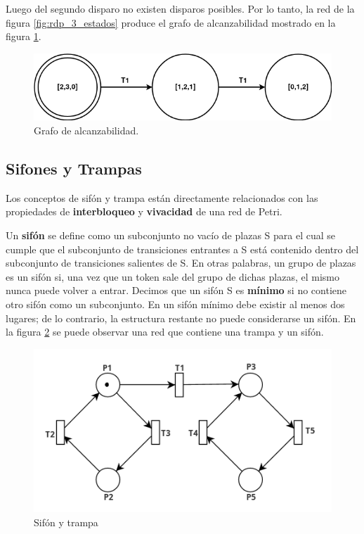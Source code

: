 Luego del segundo disparo no existen disparos posibles. Por lo tanto, la red de la figura \ref{fig:rdp_3_estados} produce el grafo de alcanzabilidad mostrado en la figura \ref{fig:grafo_alcanzabilidad}. \\

\begin{figure}[H]
    \centering
    \includegraphics[scale=0.4]{images/grafo_alcanzabilidad.png}
    \caption{Grafo de alcanzabilidad.}
    \label{fig:grafo_alcanzabilidad}
\end{figure}

\subsection{Sifones y Trampas}
Los conceptos de sifón y trampa están directamente relacionados con las propiedades de \textbf{interbloqueo} y \textbf{vivacidad} de una red de Petri.

Un \textbf{sifón} se define como un subconjunto no vacío de plazas S para el cual se cumple que el subconjunto de transiciones entrantes a S está contenido dentro del subconjunto de transiciones salientes de S.
En otras palabras, un grupo de plazas es un sifón si, una vez que un token sale del grupo de dichas plazas, el mismo nunca puede volver a entrar. 
Decimos que un sifón S es \textbf{mínimo} si no contiene otro sifón como un subconjunto. En un sifón mínimo debe existir al menos dos lugares; de lo contrario, la estructura restante no puede considerarse un sifón.
En la figura \ref{fig:rdp_sifon_trampa} se puede observar una red que contiene una trampa y un sifón.

\begin{figure}[H]
    \centering
    \includegraphics[width=0.8\linewidth]{images/rdp_sifon_trampa.png}
    \caption{Sifón y trampa}
    \label{fig:rdp_sifon_trampa}
\end{figure}

